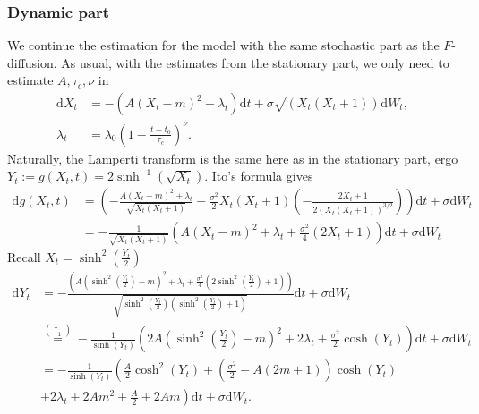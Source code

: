 \subsubsection{Dynamic part}
We continue the estimation for the model with the same stochastic part as the $F$-diffusion. As usual, with the estimates from the stationary part, we only need to estimate $A, \tau_c, \nu$ in
\begin{align}
    \mathrm{d}X_t &= -\left(A(X_t - m)^2 + \lambda_t\right)\mathrm{d}t + \sigma \sqrt{\left(X_t\left(X_t + 1\right)\right)}\mathrm{d}W_t,\\
    \lambda_t &= \lambda_0 \left(1 - \frac{t - t_0}{\tau_c}\right)^\nu.
\end{align}
Naturally, the Lamperti transform is the same here as in the stationary part, ergo $Y_t := g(X_t, t) = 2\sinh^{-1}\left(\sqrt{X_t}\right)$. Itō's formula gives 
\begin{align}
    \mathrm{d}g(X_t, t) &= \left(-\frac{A\left(X_t - m\right)^2 + \lambda_t}{\sqrt{X_t\left(X_t + 1\right)}}+ \frac{\sigma^2}{2}X_t\left(X_t + 1\right)\left(-\frac{2X_t + 1}{2\left(X_t\left(X_t + 1\right)\right)^{3/2}}\right)\right)\mathrm{d}t + \sigma\mathrm{d}W_t \nonumber \\
    &= -\frac{1}{\sqrt{X_t\left(X_t + 1\right)}}\left(A\left(X_t - m\right)^2 + \lambda_t + \frac{\sigma^2}{4}\left(2X_t + 1\right)\right)\mathrm{d}t + \sigma\mathrm{d}W_t
\end{align}
Recall $X_t = \sinh^2\left(\frac{Y_t}{2}\right)$
\begin{align}
    \mathrm{d}Y_t &= -\frac{\left(A\left(\sinh^2\left(\frac{Y_t}{2}\right) - m\right)^2 + \lambda_t + \frac{\sigma^2}{4}\left(2\sinh^2\left(\frac{Y_t}{2}\right) + 1\right)\right)}{\sqrt{\sinh^2\left(\frac{Y_t}{2}\right)\left(\sinh^2\left(\frac{Y_t}{2}\right) + 1\right)}}\mathrm{d}t + \sigma\mathrm{d}W_t 
    \nonumber\\ 
    &\overset{(\dagger_1)}{=} - \frac{1}{\sinh\left(Y_t\right)}\left(2A\left(\sinh^2\left(\frac{Y_t}{2}\right) - m\right)^2 + 2\lambda_t + \frac{\sigma^2}{2}\cosh(Y_t)\right)\mathrm{d}t + \sigma\mathrm{d}W_t \nonumber\\
    &=- \frac{1}{\sinh\left(Y_t\right)}\left(\frac{A}{2}\cosh^2\left(Y_t\right) + \left(\frac{\sigma^2}{2} - A \left(2m + 1\right)\right)\cosh\left(Y_t\right)\right. \nonumber \\ 
    &+\left. 2\lambda_t + 2Am^2 + \frac{A}{2} + 2Am\right)\mathrm{d}t + \sigma \mathrm{d}W_t. \label{eq:dynamicScaledFLamperti}
\end{align}
